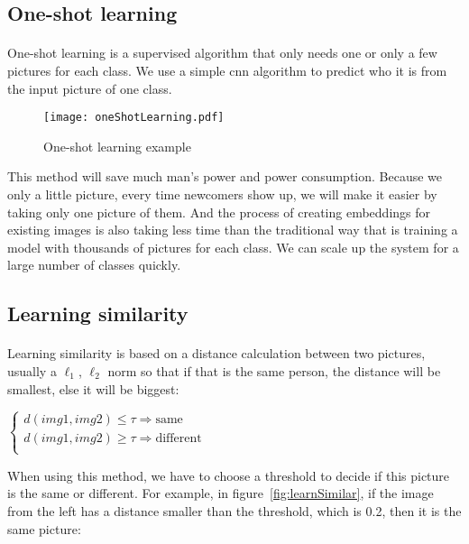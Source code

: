 \subsection{One-shot learning}
\label{oneShot}
\paragraph{}
One-shot learning is a supervised algorithm that only needs one or only a few pictures for each class. We use a simple \acrshort{cnn} algorithm to predict who it is from the input picture of one class.

\begin{figure}[H]
    \centering
    \texttt{[image: oneShotLearning.pdf]}
    \caption{One-shot learning example}
\end{figure}

This method will save much man’s power and power consumption. Because we only a little picture, every time newcomers show up, we will make it easier by taking only one picture of them. And the process of creating embeddings for existing images is also taking less time than the traditional way that is training a model with thousands of pictures for each class. We can scale up the system for a large number of classes quickly.

\subsection{Learning similarity}
\paragraph{}
Learning similarity is based on a distance calculation between two pictures, usually a $\ell_1$, $\ell_2$ norm so that if that is the same person, the distance will be smallest, else it will be biggest:

\begin{center}
    $
    \begin{cases}
    d(img1,img2) \leq \tau \Rightarrow \text{same}\\
    d(img1,img2) \geq \tau \Rightarrow \text{different}\\
    \end{cases}
    $
\end{center}

When using this method, we have to choose a threshold to decide if this picture is the same or different. For example, in figure~\ref{fig:learnSimilar}, if the image from the left has a distance smaller than the threshold, which is 0.2, then it is the same picture:


